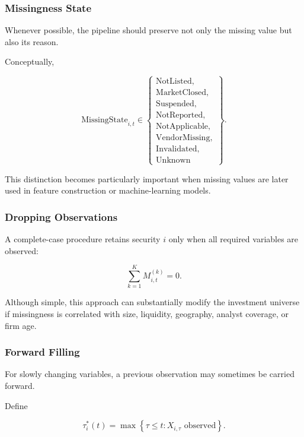\documentclass[11pt,a4paper]{article}
\begin{document}
\subsubsection{Missingness State}

Whenever possible, the pipeline should preserve not only the missing value but
also its reason.

Conceptually,

\begin{equation}
\boxed{
\mathrm{MissingState}_{i,t}
\in
\left\{
\begin{array}{l}
\mathrm{NotListed},\\
\mathrm{MarketClosed},\\
\mathrm{Suspended},\\
\mathrm{NotReported},\\
\mathrm{NotApplicable},\\
\mathrm{VendorMissing},\\
\mathrm{Invalidated},\\
\mathrm{Unknown}
\end{array}
\right\}.
}
\end{equation}

This distinction becomes particularly important when missing values are later
used in feature construction or machine-learning models.


\subsubsection{Dropping Observations}

A complete-case procedure retains security $i$ only when all required
variables are observed:

\begin{equation}
\boxed{
\sum_{k=1}^{K}
M_{i,t}^{(k)}
=
0.
}
\end{equation}

Although simple, this approach can substantially modify the investment
universe if missingness is correlated with size, liquidity, geography, analyst
coverage, or firm age.


\subsubsection{Forward Filling}

For slowly changing variables, a previous observation may sometimes be carried
forward.

Define

\begin{equation}
\tau_i^*(t)
=
\max
\left\{
\tau\leq t:
X_{i,\tau}
\text{ observed}
\right\}.
\end{equation}
\end{document}
